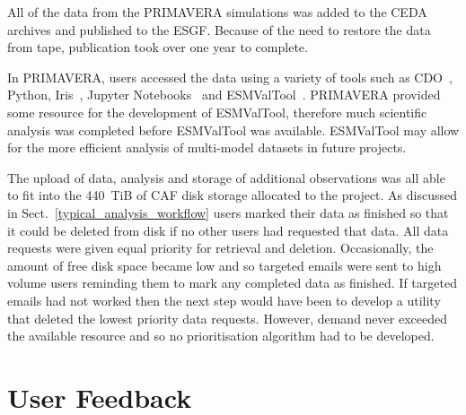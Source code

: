 \documentclass[gmd, manuscript]{copernicus}
\begin{document}
All of the data from the PRIMAVERA simulations was added to the CEDA archives and published to the ESGF. Because of the need to restore the data from tape, publication took over one year to complete.

In PRIMAVERA, users accessed the data using a variety of tools such as CDO~\citep{schulzweida_uwe_2022_7112925}, Python, Iris~\citep{Iris}, Jupyter Notebooks~\citep{Kluyver2016jupyter} and ESMValTool~\citep{Righi2020}. PRIMAVERA provided some resource for the development of ESMValTool, therefore much scientific analysis was completed before ESMValTool was available. ESMValTool may allow for the more efficient analysis of multi-model datasets in future projects.

The upload of data, analysis and storage of additional observations was all able to fit into the 440~TiB of CAF disk storage allocated to the project. As discussed in Sect.~\ref{typical_analysis_workflow} users marked their data as finished so that it could be deleted from disk if no other users had requested that data. All data requests were given equal priority for retrieval and deletion. Occasionally, the amount of free disk space became low and so targeted emails were sent to high volume users reminding them to mark any completed data as finished. If targeted emails had not worked then the next step would have been to develop a utility that deleted the lowest priority data requests. However, demand never exceeded the available resource and so no prioritisation algorithm had to be developed.

\section{User Feedback}
\end{document}
